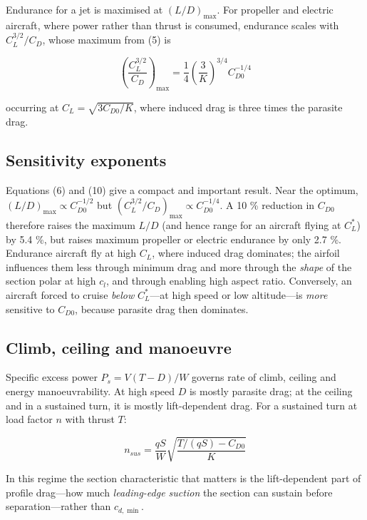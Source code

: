 \documentclass[10pt,a4paper,twocolumn]{article}
\begin{document}
Endurance for a jet is maximised at \((L/D)_{\max}\). For propeller and
electric aircraft, where power rather than thrust is consumed, endurance
scales with \(C_L^{3/2}/C_D\), whose maximum from (5) is

\[\left(\frac{C_L^{3/2}}{C_D}\right)_{\max} = \frac{1}{4}\left(\frac{3}{K}\right)^{3/4} C_{D0}^{-1/4} \tag{10}\]

occurring at \(C_L=\sqrt{3C_{D0}/K}\), where induced drag is three times
the parasite drag.

\hypertarget{sensitivity-exponents}{%
\subsection{Sensitivity exponents}\label{sensitivity-exponents}}

Equations (6) and (10) give a compact and important result. Near the
optimum, \((L/D)_{\max}\propto C_{D0}^{-1/2}\) but
\((C_L^{3/2}/C_D)_{\max}\propto C_{D0}^{-1/4}\). A 10 \% reduction in
\(C_{D0}\) therefore raises the maximum \(L/D\) (and hence range for an
aircraft flying at \(C_L^*\)) by 5.4 \%, but raises maximum propeller or
electric endurance by only 2.7 \%. Endurance aircraft fly at high
\(C_L\), where induced drag dominates; the airfoil influences them less
through minimum drag and more through the \emph{shape} of the section
polar at high \(c_l\), and through enabling high aspect ratio.
Conversely, an aircraft forced to cruise \emph{below} \(C_L^*\)---at
high speed or low altitude---is \emph{more} sensitive to \(C_{D0}\),
because parasite drag then dominates.

\hypertarget{climb-ceiling-and-manoeuvre}{%
\subsection{Climb, ceiling and
manoeuvre}\label{climb-ceiling-and-manoeuvre}}

Specific excess power \(P_s = V(T-D)/W\) governs rate of climb, ceiling
and energy manoeuvrability. At high speed \(D\) is mostly parasite drag;
at the ceiling and in a sustained turn, it is mostly lift-dependent
drag. For a sustained turn at load factor \(n\) with thrust \(T\):

\[n_{sus} = \frac{qS}{W}\sqrt{\frac{T/(qS) - C_{D0}}{K}} \tag{11}\]

In this regime the section characteristic that matters is the
lift-dependent part of profile drag---how much \emph{leading-edge
suction} the section can sustain before separation---rather than
\(c_{d,\min}\).
\end{document}
